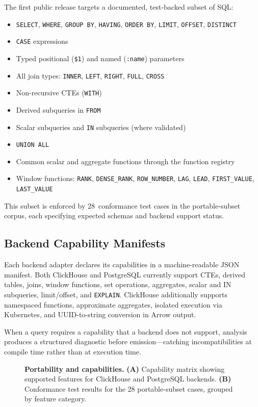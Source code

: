 \documentclass[11pt,a4paper]{article}
\begin{document}
The first public release targets a documented, test-backed subset of SQL:
\begin{itemize}
  \item \texttt{SELECT}, \texttt{WHERE}, \texttt{GROUP BY},
        \texttt{HAVING}, \texttt{ORDER BY}, \texttt{LIMIT},
        \texttt{OFFSET}, \texttt{DISTINCT}
  \item \texttt{CASE} expressions
  \item Typed positional (\texttt{\$1}) and named (\texttt{:name}) parameters
  \item All join types: \texttt{INNER}, \texttt{LEFT}, \texttt{RIGHT},
        \texttt{FULL}, \texttt{CROSS}
  \item Non-recursive CTEs (\texttt{WITH})
  \item Derived subqueries in \texttt{FROM}
  \item Scalar subqueries and \texttt{IN} subqueries (where validated)
  \item \texttt{UNION ALL}
  \item Common scalar and aggregate functions through the function registry
  \item Window functions: \texttt{RANK}, \texttt{DENSE\_RANK},
        \texttt{ROW\_NUMBER}, \texttt{LAG}, \texttt{LEAD},
        \texttt{FIRST\_VALUE}, \texttt{LAST\_VALUE}
\end{itemize}

This subset is enforced by 28~conformance test cases in the portable-subset
corpus, each specifying expected schemas and backend support status.

\subsection{Backend Capability Manifests}

Each backend adapter declares its capabilities in a machine-readable JSON
manifest.
Both ClickHouse and PostgreSQL currently support CTEs, derived tables, joins,
window functions, set operations, aggregates, scalar and IN subqueries,
limit/offset, and \texttt{EXPLAIN}.
ClickHouse additionally supports namespaced functions, approximate aggregates,
isolated execution via Kubernetes, and UUID-to-string conversion in Arrow
output.

When a query requires a capability that a backend does not support, analysis
produces a structured diagnostic before emission---catching incompatibilities
at compile time rather than at execution time.

\begin{figure}[ht]
  \centering
  
  \caption{\textbf{Portability and capabilities.}
    \textbf{(A)} Capability matrix showing supported features for ClickHouse
    and PostgreSQL backends.
    \textbf{(B)} Conformance test results for the 28 portable-subset cases,
    grouped by feature category.}
  \label{fig:portability}
\end{figure}
\end{document}
